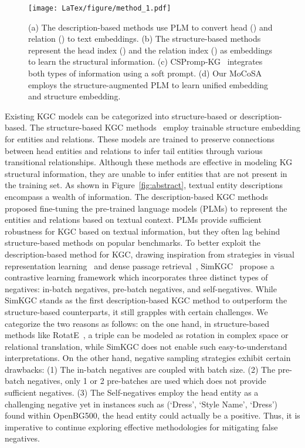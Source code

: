 \documentclass[11pt]{article}
\begin{document}
\begin{figure*}[!htb]
  \centering
\texttt{[image: LaTex/figure/method\_1.pdf]}
\caption{(a) The description-based methods use PLM to convert head () and relation () to text embeddings. (b) The structure-based methods represent the head index () and the relation index () as embeddings to learn the structural information.
(c) CSPromp-KG~\cite{Chen2023DippingPS} integrates both types of information using a soft prompt.
(d) Our MoCoSA employs the structure-augmented PLM to learn unified embedding and structure embedding.
  }
\label{fig:method_1}
\vspace{-10pt}
\end{figure*}

Existing KGC models can be categorized into structure-based or description-based. The structure-based KGC methods~\cite{bordes2013translating, trouillon2016complex} employ trainable structure embedding for entities and relations. These models are trained to preserve connections between head entities and relations to infer tail entities through various transitional relationships. Although these methods are effective in modeling KG structural information, 
they are unable to infer entities that are not present in the training set. As shown in Figure~\ref{fig:abstract}, textual entity descriptions encompass a wealth of information. The description-based KGC methods~\cite{Choi2021MEMKGCME, yao2019kg, Wang2022LanguageMA} proposed fine-tuning the pre-trained language models (PLMs) to represent the entities and relations based on textual context. PLMs provide sufficient robustness for KGC based on textual information, but they often lag behind structure-based methods on popular benchmarks. To better exploit the description-based method for KGC, drawing inspiration from strategies in visual representation learning~\cite{Khosla2020SupervisedCL} and dense passage retrieval~\cite{Karpukhin2020DensePR}, SimKGC~\cite{Wang2022SimKGCSC} propose a contrastive learning framework
 which incorporates three distinct types of negatives: in-batch negatives, pre-batch negatives, and self-negatives. While SimKGC stands as the first description-based KGC method to outperform the structure-based counterparts, it still grapples with certain challenges. We categorize the two reasons as follows: on the one hand, in structure-based methods like RotatE~\cite{sun2018rotate}, a triple can be modeled as rotation in complex space or relational translation, while SimKGC
does not enable such easy-to-understand interpretations. On the other hand, negative sampling strategies exhibit certain drawbacks: (1) The in-batch negatives are coupled with batch size. (2) The pre-batch negatives, only 1 or 2 pre-batches are used which does not provide sufficient negatives. (3) The Self-negatives employ the head entity as a challenging negative yet in instances such as (`Dress', `Style Name', `Dress') found within OpenBG500, the head entity could actually be a positive. Thus, it is imperative to continue exploring effective methodologies for mitigating false negatives.
\end{document}
